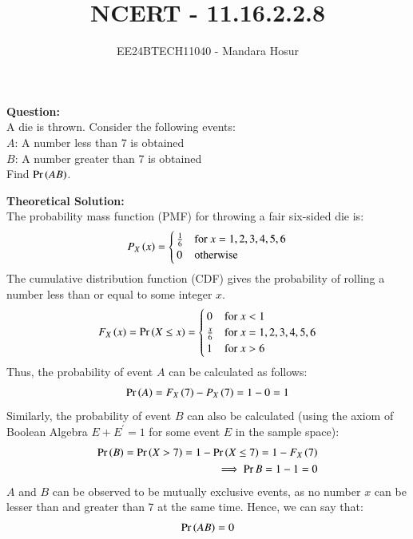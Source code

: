 \documentclass[journal]{IEEEtran}
\begin{document}

\vspace{3cm}

\title{NCERT - 11.16.2.2.8}
\author{EE24BTECH11040 - Mandara Hosur}
{\let\newpage\relax\maketitle}

\renewcommand{\thefigure}{\theenumi}
\renewcommand{\thetable}{\theenumi}
\setlength{\intextsep}{10pt} %


\renewcommand{\thetable}{\theenumi}

\textbf{Question:}\\
A die is thrown. Consider the following events: \\
$A$: A number less than 7 is obtained \\
$B$: A number greater than 7 is obtained \\
Find $\Pr\left(AB\right)$.

\textbf{Theoretical Solution:}\\
The probability mass function (PMF) for throwing a fair six-sided die is:
\begin{align}
    P_X\left(x\right) = \begin{cases}
        \frac{1}{6} & \text{for } x = 1, 2, 3, 4, 5, 6 \\
        0 & \text{otherwise}
    \end{cases}
\end{align}
The cumulative distribution function (CDF) gives the probability of rolling a number less than or equal to some integer $x$.
\begin{align}
    F_X\left(x\right) = \Pr\left(X \leq x\right) = \begin{cases}
        0 & \text{for } x < 1 \\
        \frac{x}{6} & \text{for } x = 1, 2, 3, 4, 5, 6 \\
        1 & \text{for } x > 6
    \end{cases}
\end{align}
Thus, the probability of event $A$ can be calculated as follows:
\begin{align}
    \Pr\left(A\right) = F_X\left(7\right) - P_X\left(7\right) = 1 - 0 = 1
\end{align}
Similarly, the probability of event $B$ can also be calculated (using the axiom of Boolean Algebra $E+E^{\prime}=1$ for some event $E$ in the sample space):
\begin{align}
    \Pr\left(B\right) = \Pr\left(X > 7\right) = 1 - \Pr\left(X \leq 7\right) = 1 - F_X\left(7\right) \\
    \implies \Pr{B} = 1 - 1 = 0
\end{align}
$A$ and $B$ can be observed to be mutually exclusive events, as no number $x$ can be lesser than and greater than 7 at the same time.
Hence, we can say that:
\begin{align}
    \Pr\left(AB\right) = 0
\end{align}
\end{document}
